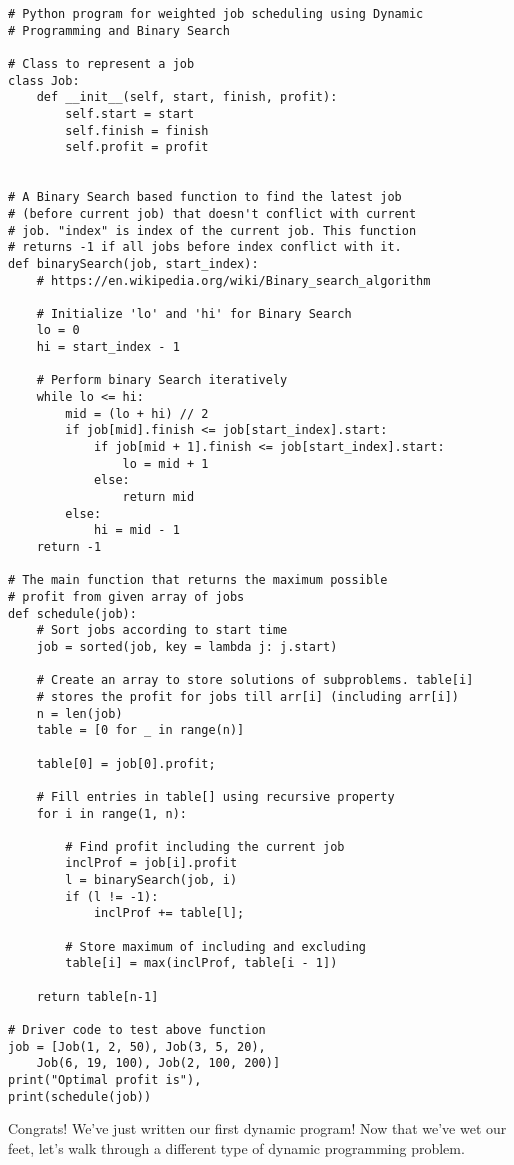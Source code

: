 \documentclass{article}
\begin{document}
\begin{verbatim}
# Python program for weighted job scheduling using Dynamic 
# Programming and Binary Search 

# Class to represent a job 
class Job: 
	def __init__(self, start, finish, profit): 
		self.start = start 
		self.finish = finish 
		self.profit = profit 


# A Binary Search based function to find the latest job 
# (before current job) that doesn't conflict with current 
# job. "index" is index of the current job. This function 
# returns -1 if all jobs before index conflict with it. 
def binarySearch(job, start_index): 
	# https://en.wikipedia.org/wiki/Binary_search_algorithm

	# Initialize 'lo' and 'hi' for Binary Search 
	lo = 0
	hi = start_index - 1

	# Perform binary Search iteratively 
	while lo <= hi: 
		mid = (lo + hi) // 2
		if job[mid].finish <= job[start_index].start: 
			if job[mid + 1].finish <= job[start_index].start: 
				lo = mid + 1
			else: 
				return mid 
		else: 
			hi = mid - 1
	return -1

# The main function that returns the maximum possible 
# profit from given array of jobs 
def schedule(job): 
	# Sort jobs according to start time 
	job = sorted(job, key = lambda j: j.start) 

	# Create an array to store solutions of subproblems. table[i] 
	# stores the profit for jobs till arr[i] (including arr[i]) 
	n = len(job) 
	table = [0 for _ in range(n)] 

	table[0] = job[0].profit; 

	# Fill entries in table[] using recursive property 
	for i in range(1, n): 

		# Find profit including the current job 
		inclProf = job[i].profit 
		l = binarySearch(job, i) 
		if (l != -1): 
			inclProf += table[l]; 

		# Store maximum of including and excluding 
		table[i] = max(inclProf, table[i - 1]) 

	return table[n-1] 

# Driver code to test above function 
job = [Job(1, 2, 50), Job(3, 5, 20), 
	Job(6, 19, 100), Job(2, 100, 200)] 
print("Optimal profit is"), 
print(schedule(job))
\end{verbatim}
Congrats! We've just written our first dynamic program!  Now that we’ve wet our feet,  let's walk through a different type of dynamic programming problem.
\newpage

\newpage
\end{document}
